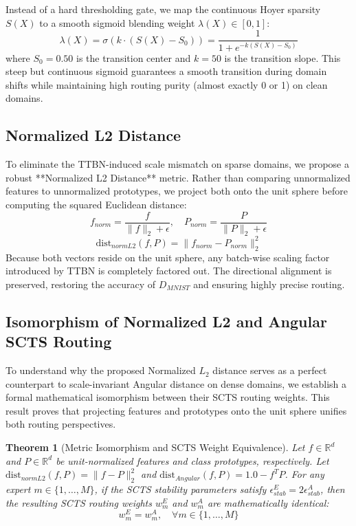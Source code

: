 \documentclass{article}
\theoremstyle{plain}
\newtheorem{theorem}{Theorem}[section]
\theoremstyle{definition}
\theoremstyle{remark}
\begin{document}
Instead of a hard thresholding gate, we map the continuous Hoyer sparsity $S(X)$ to a smooth sigmoid blending weight $\lambda(X) \in [0, 1]$:
\begin{equation}
    \lambda(X) = \sigma(k \cdot (S(X) - S_0)) = \frac{1}{1 + e^{-k(S(X) - S_0)}}
\end{equation}
where $S_0 = 0.50$ is the transition center and $k = 50$ is the transition slope. This steep but continuous sigmoid guarantees a smooth transition during domain shifts while maintaining high routing purity (almost exactly 0 or 1) on clean domains.

\subsection{Normalized L2 Distance}

To eliminate the TTBN-induced scale mismatch on sparse domains, we propose a robust **Normalized L2 Distance** metric. Rather than comparing unnormalized features to unnormalized prototypes, we project both onto the unit sphere before computing the squared Euclidean distance:
\begin{equation}
    f_{norm} = \frac{f}{\|f\|_2 + \epsilon}, \quad P_{norm} = \frac{P}{\|P\|_2 + \epsilon}
\end{equation}
\begin{equation}
    \text{dist}_{normL2}(f, P) = \|f_{norm} - P_{norm}\|_2^2
\end{equation}
Because both vectors reside on the unit sphere, any batch-wise scaling factor introduced by TTBN is completely factored out. The directional alignment is preserved, restoring the accuracy of $D_{MNIST}$ and ensuring highly precise routing.

\subsection{Isomorphism of Normalized L2 and Angular SCTS Routing}

To understand why the proposed Normalized $L_2$ distance serves as a perfect counterpart to scale-invariant Angular distance on dense domains, we establish a formal mathematical isomorphism between their SCTS routing weights. This result proves that projecting features and prototypes onto the unit sphere unifies both routing perspectives.

\begin{theorem}[Metric Isomorphism and SCTS Weight Equivalence]
Let $f \in \mathbb{R}^d$ and $P \in \mathbb{R}^d$ be unit-normalized features and class prototypes, respectively. Let $\text{dist}_{normL2}(f, P) = \|f - P\|_2^2$ and $\text{dist}_{Angular}(f, P) = 1.0 - f^T P$. 
For any expert $m \in \{1, \dots, M\}$, if the SCTS stability parameters satisfy $\epsilon_{stab}^E = 2 \epsilon_{stab}^A$, then the resulting SCTS routing weights $w^E_m$ and $w^A_m$ are mathematically identical:
\begin{equation}
    w^E_m = w^A_m, \quad \forall m \in \{1, \dots, M\}
\end{equation}
\end{theorem}
\end{document}
